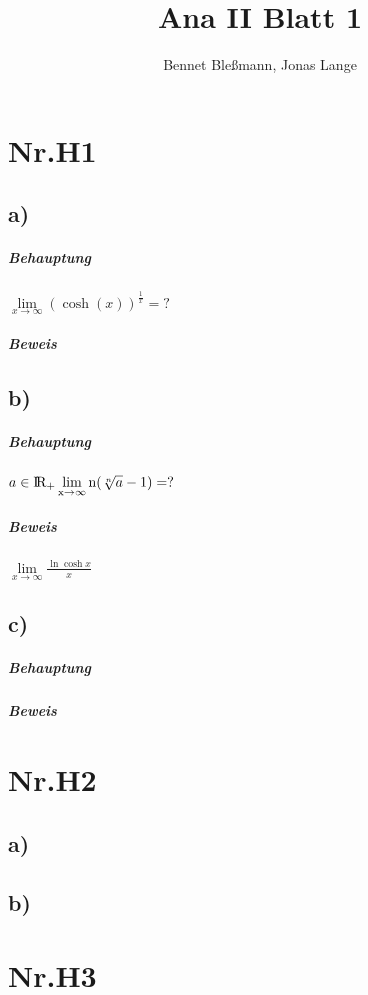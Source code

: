 \documentclass[12pt,a4paper,oneside,ngerman]{article}
\title{Ana II Blatt 1}
\author{Bennet Bleßmann, Jonas Lange}
\begin{document}
\maketitle
\section*{Nr.H1}
\subsection*{a)}

\subparagraph*{Behauptung}

$\lim\limits_{x \to \infty}(\cosh(x))^{\frac{1}{x}} = ?$

\subparagraph*{Beweis}
	
\subsection*{b)}

\subparagraph*{Behauptung}

$a \in \rm I \!R_{+} \lim\limits_{x \to \infty} n(\sqrt[n]{a}-1) = ?$


\subparagraph*{Beweis}

$\lim\limits_{x \to \infty } \frac{\ln{\cosh{x}}}{x} $





\subsection*{c)}

\subparagraph*{Behauptung}

\subparagraph*{Beweis}

\section*{Nr.H2}

\subsection*{a)}

\subsection*{b)}


\section*{Nr.H3}
\end{document}

